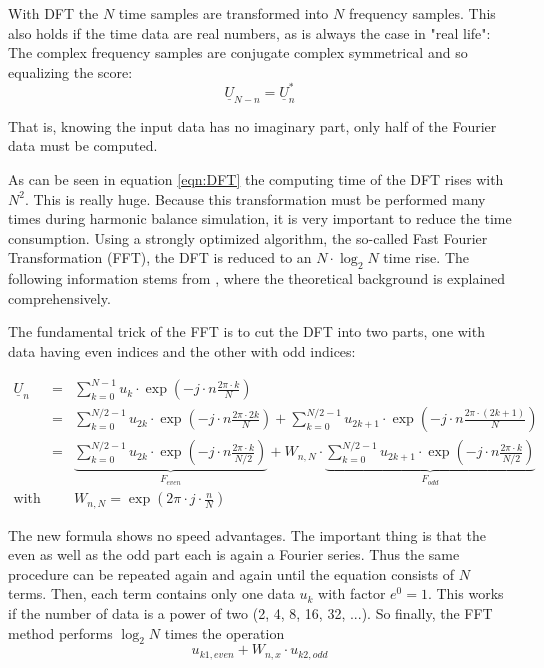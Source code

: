 \addvspace{12pt}

With DFT the $N$ time samples are transformed into $N$ frequency samples.
This also holds if the time data are real numbers, as is always
the case in "real life": The complex frequency samples are conjugate
complex symmetrical and so equalizing the score:
\begin{equation}
\underline{U}_{N-n} = \underline{U}_n^*
\end{equation}

\addvspace{12pt}

That is, knowing the input data has no imaginary part, only half of
the Fourier data must be computed.

\addvspace{12pt}

As can be seen in equation \ref{eqn:DFT} the computing time of the
DFT rises with $N^2$. This is really huge. Because this transformation
must be performed many times during harmonic balance simulation, it is
very important to reduce the time consumption. Using a strongly
optimized algorithm, the so-called Fast Fourier Transformation (FFT),
the DFT is reduced to an $N\cdot\log_2 N$ time rise.
The following information stems from \cite{Press},
where the theoretical background is explained comprehensively.

\addvspace{12pt}

The fundamental trick of the FFT is to cut the DFT into two parts,
one with data having even indices and the other with odd indices:

\begin{eqnarray}
\underline{U}_n & = &
  \sum_{k=0}^{N-1} u_k\cdot \exp\left( -j\cdot n\frac{2\pi\cdot k}{N} \right) \\
  & = & \sum_{k=0}^{N/2-1} u_{2k}\cdot
        \exp\left( -j\cdot n\frac{2\pi\cdot 2k}{N} \right) +
        \sum_{k=0}^{N/2-1} u_{2k+1}\cdot
        \exp\left( -j\cdot n\frac{2\pi\cdot (2k+1)}{N} \right) \\
  & = & \underbrace{ \sum_{k=0}^{N/2-1} u_{2k}\cdot
        \exp\left( -j\cdot n\frac{2\pi\cdot k}{N/2} \right) }_{F_{even}} +
        W_{n,N}\cdot \underbrace{ \sum_{k=0}^{N/2-1} u_{2k+1}\cdot
        \exp\left( -j\cdot n\frac{2\pi\cdot k}{N/2} \right) }_{F_{odd}} \\
\text{with} & & W_{n,N} = \exp\left( 2\pi\cdot j\cdot \frac{n}{N} \right)
\end{eqnarray}

The new formula shows no speed advantages. The important thing is that
the even as well as the odd part each is again a Fourier series. Thus
the same procedure can be repeated again and again until the equation
consists of $N$ terms. Then, each term contains only one data $u_k$
with factor $e^0=1$. This works if the number of data is a power of
two (2, 4, 8, 16, 32, ...).
So finally, the FFT method performs $\log_2 N$ times the operation
\begin{equation}
\label{eqn:FFTstep}
u_{k1,even} + W_{n,x}\cdot u_{k2,odd}
\end{equation}

